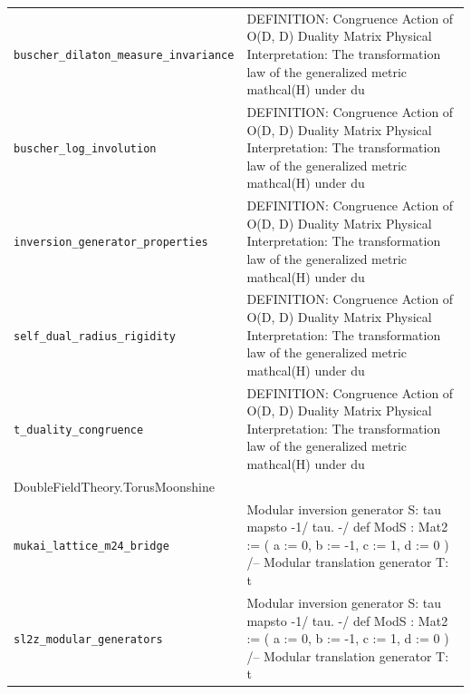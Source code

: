 \begin{longtable}{p{}p{}}
\quad\texttt{\footnotesize buscher\_dilaton\_measure\_invariance} & {\footnotesize DEFINITION: Congruence Action of O(D, D) Duality Matrix Physical Interpretation: The transformation law of the generalized metric  mathcal(H) under du} \\
\quad\texttt{\footnotesize buscher\_log\_involution} & {\footnotesize DEFINITION: Congruence Action of O(D, D) Duality Matrix Physical Interpretation: The transformation law of the generalized metric  mathcal(H) under du} \\
\quad\texttt{\footnotesize inversion\_generator\_properties} & {\footnotesize DEFINITION: Congruence Action of O(D, D) Duality Matrix Physical Interpretation: The transformation law of the generalized metric  mathcal(H) under du} \\
\quad\texttt{\footnotesize self\_dual\_radius\_rigidity} & {\footnotesize DEFINITION: Congruence Action of O(D, D) Duality Matrix Physical Interpretation: The transformation law of the generalized metric  mathcal(H) under du} \\
\quad\texttt{\footnotesize t\_duality\_congruence} & {\footnotesize DEFINITION: Congruence Action of O(D, D) Duality Matrix Physical Interpretation: The transformation law of the generalized metric  mathcal(H) under du} \\
\multicolumn{2}{l}{\textsf{\small DoubleFieldTheory.TorusMoonshine}} \\
\quad\texttt{\footnotesize mukai\_lattice\_m24\_bridge} & {\footnotesize Modular inversion generator S:  tau  mapsto -1/ tau. -/ def ModS : Mat2 := ( a := 0, b := -1, c := 1, d := 0 ) /-- Modular translation generator T:  t} \\
\quad\texttt{\footnotesize sl2z\_modular\_generators} & {\footnotesize Modular inversion generator S:  tau  mapsto -1/ tau. -/ def ModS : Mat2 := ( a := 0, b := -1, c := 1, d := 0 ) /-- Modular translation generator T:  t} \\
\end{longtable}
